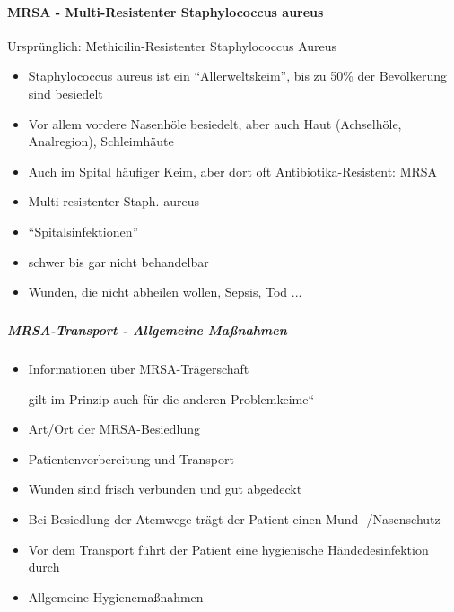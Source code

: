 \documentclass{article}
\begin{document}
\paragraph[MRSA - Multi-Resistenter Staphylococcus aureus]{MRSA -
Multi-Resistenter Staphylococcus aureus}
Urspr\"unglich: Methicilin-Resistenter Staphylococcus Aureus

\begin{itemize}
\item Staphylococcus aureus ist ein
{\textquotedblleft}Allerweltskeim{\textquotedblright}, bis zu 50\% der
Bev\"olkerung sind besiedelt

\item Vor allem vordere Nasenh\"ole besiedelt, aber auch Haut
(Achselh\"ole, Analregion), Schleimh\"aute

\item Auch im Spital h\"aufiger Keim, aber dort oft
Antibiotika-Resistent: MRSA

\end{itemize}
\begin{itemize}
\item Multi-resistenter Staph. aureus

\item {\textquotedblleft}Spitalsinfektionen{\textquotedblright}

\item schwer bis gar nicht behandelbar

\item Wunden, die nicht abheilen wollen, Sepsis, Tod ...

\end{itemize}
\subparagraph{}
\subparagraph[MRSA-Transport - Allgemeine Ma{\ss}nahmen]{MRSA-Transport
- Allgemeine Ma{\ss}nahmen}
\label{bkm:RefHeading40262819}\begin{itemize}
\item Informationen \"uber MRSA-Tr\"agerschaft

\begin{center}
\begin{minipage}{4.941cm}
 gilt im Prinzip auch f\"ur die anderen
{\quotedblbase}Problemkeime{\textquotedblleft}

\end{minipage}
\end{center}
\item Art/Ort der MRSA-Besiedlung

\item Patientenvorbereitung und Transport

\item Wunden sind frisch verbunden und gut abgedeckt

\item Bei Besiedlung der Atemwege tr\"agt der Patient einen Mund-
/Nasenschutz

\item Vor dem Transport f\"uhrt der Patient eine hygienische
H\"andedesinfektion durch

\item Allgemeine Hygienema{\ss}nahmen

\end{itemize}
\end{document}
